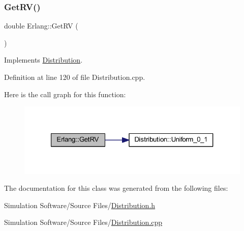 \subsubsection{\texorpdfstring{Get\+R\+V()}{GetRV()}}
{\footnotesize\ttfamily double Erlang\+::\+Get\+RV (\begin{DoxyParamCaption}{ }\end{DoxyParamCaption})\hspace{0.3cm}{\ttfamily [virtual]}}



Implements \hyperlink{class_distribution_a63b433850d7b47d84eb69448f7916719}{Distribution}.



Definition at line 120 of file Distribution.\+cpp.

Here is the call graph for this function\+:\nopagebreak
\begin{figure}[H]
\begin{center}
\leavevmode
\includegraphics[width=321pt]{class_erlang_a5ae5b56e37bd2c5ee4318fcc12259442_cgraph}
\end{center}
\end{figure}


The documentation for this class was generated from the following files\+:\begin{DoxyCompactItemize}
\item 
Simulation Software/\+Source Files/\hyperlink{_distribution_8h}{Distribution.\+h}\item 
Simulation Software/\+Source Files/\hyperlink{_distribution_8cpp}{Distribution.\+cpp}\end{DoxyCompactItemize}
